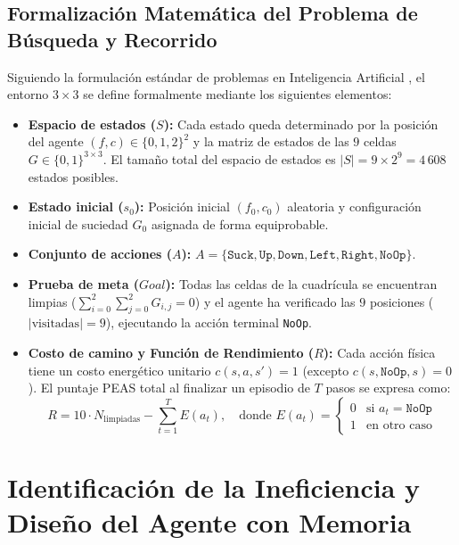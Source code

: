 \documentclass[runningheads]{llncs}
\begin{document}
\subsection{Formalización Matemática del Problema de Búsqueda y Recorrido}
Siguiendo la formulación estándar de problemas en Inteligencia Artificial \cite{russell2021}, el entorno $3\times 3$ se define formalmente mediante los siguientes elementos:
\begin{itemize}
    \item \textbf{Espacio de estados ($S$):} Cada estado queda determinado por la posición del agente $(f, c) \in \{0,1,2\}^2$ y la matriz de estados de las $9$ celdas $G \in \{0,1\}^{3\times 3}$. El tamaño total del espacio de estados es $|S| = 9 \times 2^9 = 4\,608$ estados posibles.
    \item \textbf{Estado inicial ($s_0$):} Posición inicial $(f_0, c_0)$ aleatoria y configuración inicial de suciedad $G_0$ asignada de forma equiprobable.
    \item \textbf{Conjunto de acciones ($A$):} $A = \{\texttt{Suck}, \texttt{Up}, \texttt{Down}, \texttt{Left}, \texttt{Right}, \texttt{NoOp}\}$.
    \item \textbf{Prueba de meta ($Goal$):} Todas las celdas de la cuadrícula se encuentran limpias ($\sum_{i=0}^{2}\sum_{j=0}^{2} G_{i,j} = 0$) y el agente ha verificado las $9$ posiciones ($|\text{visitadas}| = 9$), ejecutando la acción terminal \texttt{NoOp}.
    \item \textbf{Costo de camino y Función de Rendimiento ($R$):} Cada acción física tiene un costo energético unitario $c(s, a, s') = 1$ (excepto $c(s, \texttt{NoOp}, s) = 0$). El puntaje PEAS total al finalizar un episodio de $T$ pasos se expresa como:
    \begin{equation}
        R = 10 \cdot N_{\text{limpiadas}} - \sum_{t=1}^{T} E(a_t), \quad \text{donde } E(a_t) = \begin{cases} 0 & \text{si } a_t = \texttt{NoOp} \\ 1 & \text{en otro caso} \end{cases}
    \end{equation}
\end{itemize}

\section{Identificación de la Ineficiencia y Diseño del Agente con Memoria}
\end{document}
